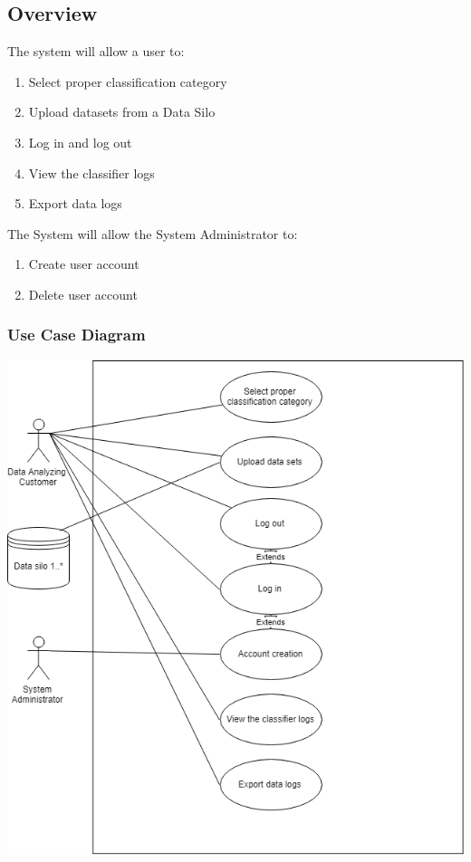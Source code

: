 \documentclass[12pt,oneside,letterpaper]{article}
\begin{document}
\subsection{Overview}
The system will allow a user to:
\begin{enumerate}
    \item Select proper classification category
    \item Upload datasets from a Data Silo
    \item Log in and log out
    \item View the classifier logs
    \item Export data logs
\end{enumerate}
The System will allow the System Administrator to: 
\begin{enumerate}
    \item Create user account
    \item Delete user account
\end{enumerate}
\subsubsection{Use Case Diagram}
\includegraphics[scale = 0.6]{UseCaseDiagram_Geraldo.png}
\begingroup
{}
\endgroup
\end{document}

